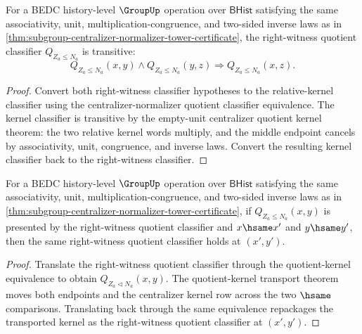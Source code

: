 \begin{theorem}
\label{thm:subgroup-centralizer-right-quotient-classifier-trans}
For a BEDC history-level $\GroupUp$ operation over $\mathsf{BHist}$
satisfying the same associativity, unit, multiplication-congruence, and
two-sided inverse laws as in
\autoref{thm:subgroup-centralizer-normalizer-tower-certificate}, the
right-witness quotient classifier $Q_{Z_a\leq N_a}$ is transitive:
$$
Q_{Z_a\leq N_a}(x,y)\land Q_{Z_a\leq N_a}(y,z)
\Longrightarrow Q_{Z_a\leq N_a}(x,z).
$$
\end{theorem}
\begin{proof}
Convert both right-witness classifier hypotheses to the relative-kernel
classifier using the centralizer-normalizer quotient classifier equivalence.
The kernel classifier is transitive by the empty-unit centralizer quotient
kernel theorem: the two relative kernel words multiply, and the middle
endpoint cancels by associativity, unit, congruence, and inverse laws. Convert
the resulting kernel classifier back to the right-witness classifier.
\end{proof}

\begin{theorem}
\label{thm:subgroup-right-quotient-classifier-hsame-transport}
For a BEDC history-level $\GroupUp$ operation over $\mathsf{BHist}$
satisfying the same associativity, unit, multiplication-congruence, and
two-sided inverse laws as in
\autoref{thm:subgroup-centralizer-normalizer-tower-certificate}, if
$Q_{Z_a\leq N_a}(x,y)$ is presented by the right-witness quotient classifier
and $x\hsame x'$ and $y\hsame y'$, then the same right-witness quotient
classifier holds at $(x',y')$.
\end{theorem}
\begin{proof}
Translate the right-witness quotient classifier through the quotient-kernel
equivalence to obtain $Q_{Z_a\triangleleft N_a}(x,y)$. The quotient-kernel
transport theorem moves both endpoints and the centralizer kernel row across
the two $\hsame$ comparisons. Translating back through the same equivalence
repackages the transported kernel as the right-witness quotient classifier at
$(x',y')$.
\end{proof}

